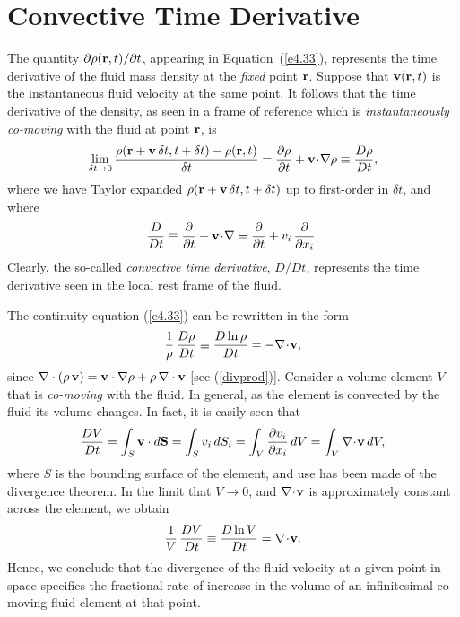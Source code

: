 \section{Convective Time Derivative}\label{sconv}
The quantity $\partial \rho({\bf r}, t)/\partial t$, appearing in Equation~(\ref{e4.33}),  represents the time derivative of the fluid mass density at the {\em fixed}\/ point ${\bf r}$. Suppose that ${\bf v}({\bf r},t)$ is the instantaneous fluid velocity at the same point. It follows
that the time derivative of the  density, as seen in a frame of reference which is {\em instantaneously co-moving}\/ with the fluid
at point ${\bf r}$, is
\begin{equation}
\lim_{\delta t\rightarrow 0} \frac{\rho({\bf r}+{\bf v}\,\delta t,t+\delta t)-\rho({\bf r}, t)}{\delta t} = \frac{\partial \rho}{\partial t} + {\bf v}\!\cdot\!\nabla \rho \equiv \frac{D \rho}{Dt},
\end{equation}
where we have Taylor expanded $\rho({\bf r}+{\bf v}\,\delta t, t+\delta t)$ up to first-order in $\delta t$, and where
\begin{equation}\label{e4.35}
\frac{D}{Dt}\equiv  \frac{\partial}{\partial t} + {\bf v}\!\cdot\!\nabla = \frac{\partial}{\partial t} + v_i\,\frac{\partial}{\partial x_i}.
\end{equation}
Clearly, the so-called {\em convective time derivative}, $D/Dt$, represents the time derivative seen in the  local rest frame of the fluid.

The continuity equation (\ref{e4.33}) can be rewritten in the form
\begin{equation}\label{e4.36}
\frac{1}{\rho}\,\frac{D\rho}{Dt}\equiv \frac{D\ln\rho}{Dt}=-\nabla\!\cdot\!{\bf v},
\end{equation}
since $\nabla \cdot(\rho\,{\bf v}) = {\bf v}\cdot\nabla \rho + \rho\,\nabla \cdot{\bf v}$ [see (\ref{divprod})]. Consider a
 volume element $V$ that is {\em co-moving}\/ with the fluid. 
 In general, as the element is convected by the fluid its volume changes. In fact, it is easily
 seen that
 \begin{equation}
 \frac{DV}{Dt} = \int_S{\bf v}\cdot d{\bf S}=\int_S v_i\,dS_i = \int_V \frac{\partial v_i}{\partial x_i}\,dV = \int_V \nabla\!\cdot \! {\bf v}\,dV,
 \end{equation}
 where $S$ is the bounding surface of the element, and use has been made of the divergence theorem. In the limit that $V\rightarrow 0$,
 and $\nabla\!\cdot\!{\bf v}$ is approximately constant across the element, we obtain
 \begin{equation}\label{e4.38}
 \frac{1}{V}\,\frac{DV}{Dt} \equiv \frac{D\ln V}{Dt} = \nabla\!\cdot\!{\bf v}.
 \end{equation}
 Hence, we conclude that the divergence of the fluid velocity at a given point in space specifies
 the fractional rate of increase in the volume of an infinitesimal co-moving fluid element at that point. 
 
